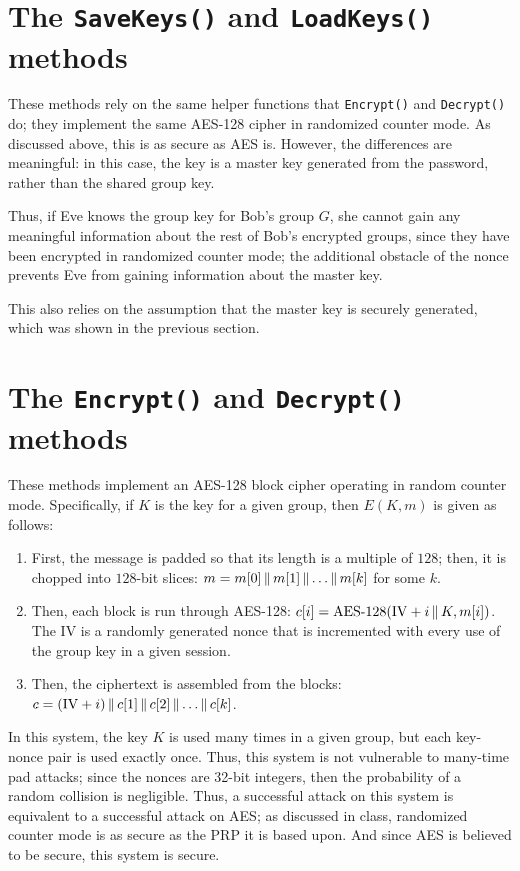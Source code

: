 \documentclass{amsart}
\begin{document}
\section{The \texttt{SaveKeys()} and \texttt{LoadKeys()} methods}%
These methods rely on the same helper functions that \verb+Encrypt()+ and \verb+Decrypt()+ do; they implement the same AES-128 cipher in randomized counter mode. As discussed above, this is as secure as AES is. However, the differences are meaningful: in this case, the key is a master key generated from the password, rather than the shared group key.

Thus, if Eve knows the group key for Bob's group $G$, she cannot gain any meaningful information about the rest of Bob's encrypted groups, since they have been encrypted in randomized counter mode; the additional obstacle of the nonce prevents Eve from gaining information about the master key.

This also relies on the assumption that the master key is securely generated, which was shown in the previous section.%

\section{The \texttt{Encrypt()} and \texttt{Decrypt()} methods}%
These methods implement an AES-128 block cipher operating in random counter mode. Specifically, if $K$ is the key for a given group, then $E(K,m)$ is given as follows:
\begin{enumerate}
\item First, the message is padded so that its length is a multiple of $128$; then, it is chopped into $128$-bit slices: $m = m[0]\operatorname{\|} m[1]\operatorname{\|}\dots\operatorname{\|} m[k]$ for some $k$.
\item Then, each block is run through AES-128: $c[i] = \operatorname{AES-128}(\mathrm{IV} + i\operatorname{\|} K,m[i])$. The $\mathrm{IV}$ is a randomly generated nonce that is incremented with every use of the group key in a given session.
\item Then, the ciphertext is assembled from the blocks: $c = (\mathrm{IV} + i) \operatorname{\|} c[1] \operatorname{\|} c[2] \operatorname{\|}\dots\operatorname{\|} c[k]$.
\end{enumerate}
In this system, the key $K$ is used many times in a given group, but each key-nonce pair is used exactly once. Thus, this system is not vulnerable to many-time pad attacks; since the nonces are 32-bit integers, then the probability of a random collision is negligible. Thus, a successful attack on this system is equivalent to a successful attack on AES; as discussed in class, randomized counter mode is as secure as the PRP it is based upon. And since AES is believed to be secure, this system is secure.
\end{document}

